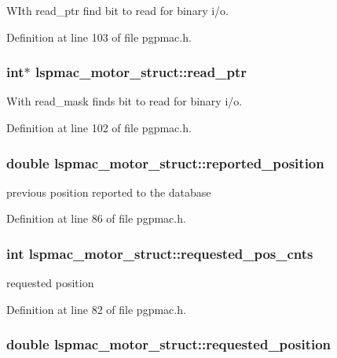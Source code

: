 WIth read\_\-ptr find bit to read for binary i/o. 

Definition at line 103 of file pgpmac.h.\hypertarget{structlspmac__motor__struct_a844b28ccabab5048ca216db074fb9704}{
\subsubsection[{read\_\-ptr}]{\setlength{\rightskip}{0pt plus 5cm}int$\ast$ {\bf lspmac\_\-motor\_\-struct::read\_\-ptr}}}
\label{structlspmac__motor__struct_a844b28ccabab5048ca216db074fb9704}


With read\_\-mask finds bit to read for binary i/o. 

Definition at line 102 of file pgpmac.h.\hypertarget{structlspmac__motor__struct_ae5f1f605a0f587500e627332ad4e5e7e}{
\subsubsection[{reported\_\-position}]{\setlength{\rightskip}{0pt plus 5cm}double {\bf lspmac\_\-motor\_\-struct::reported\_\-position}}}
\label{structlspmac__motor__struct_ae5f1f605a0f587500e627332ad4e5e7e}


previous position reported to the database 

Definition at line 86 of file pgpmac.h.\hypertarget{structlspmac__motor__struct_a6e8dc9c11dc52a439fe9837230f93ce2}{
\subsubsection[{requested\_\-pos\_\-cnts}]{\setlength{\rightskip}{0pt plus 5cm}int {\bf lspmac\_\-motor\_\-struct::requested\_\-pos\_\-cnts}}}
\label{structlspmac__motor__struct_a6e8dc9c11dc52a439fe9837230f93ce2}


requested position 

Definition at line 82 of file pgpmac.h.\hypertarget{structlspmac__motor__struct_af8cdc94c6e2478b12ce942d4cf1d7499}{
\subsubsection[{requested\_\-position}]{\setlength{\rightskip}{0pt plus 5cm}double {\bf lspmac\_\-motor\_\-struct::requested\_\-position}}}
\label{structlspmac__motor__struct_af8cdc94c6e2478b12ce942d4cf1d7499}


